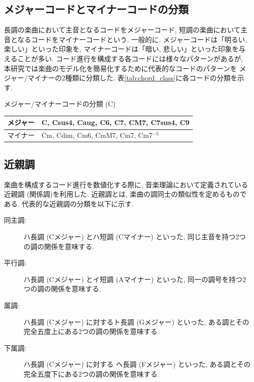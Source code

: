 \documentclass{jpreprint}
\begin{document}
\begin{multicols}{2}
\subsection{メジャーコードとマイナーコードの分類}
長調の楽曲において主音となるコードをメジャーコード,
短調の楽曲において主音となるコードをマイナーコードという.
一般的に,
メジャーコードは「明るい, 楽しい」といった印象を,
マイナーコードは「暗い, 悲しい」といった印象を与えることが多い.
コード進行を構成する各コードには様々なパターンがあるが,
本研究では楽曲のモデル化を簡易化するために代表的なコードのパターンを
メジャー/マイナーの2種類に分類した.
表\ref{tab:chord_class}に各コードの分類を示す.

\begin{tablehere}
  \begin{center}
  \caption{メジャー/マイナーコードの分類 (C)}
  \label{tab:chord_class}
  \begin{tabular}{|c|p{}|}
    \hline
    メジャー & C, Csus4, Caug, C6, C7, CM7, C7sus4, C9 \\
    \hline
    マイナー & Cm, Cdim, Cm6, CmM7, Cm7, Cm7$^{-5}$ \\
    \hline
  \end{tabular}
  \end{center}
\end{tablehere}

\subsection{近親調}
楽曲を構成するコード進行を数値化する際に,
音楽理論において定義されている近親調 (関係調)\cite{NGSW07}を利用した.
近親調とは,
楽曲の調同士の類似性を定めるものである.
代表的な近親調の分類を以下に示す.
\begin{description}
  \item[同主調:]
    ハ長調 (Cメジャー) とハ短調 (Cマイナー) といった, 
    同じ主音を持つ2つの調の関係を意味する.
  \item[平行調:]
    ハ長調 (Cメジャー) とイ短調 (Aマイナー) といった,
    同一の調号を持つ2つの調の関係を意味する.
  \item[属調:]
    ハ長調 (Cメジャー) に対するト長調 (Gメジャー) といった,
    ある調とその完全五度上にある2つの調の関係を意味する.
  \item[下属調:]
    ハ長調 (Cメジャー) に対する ヘ長調 (Fメジャー) といった,
    ある調とその完全五度下にある2つの調の関係を意味する.
\end{description}


\end{multicols}
\end{document}

